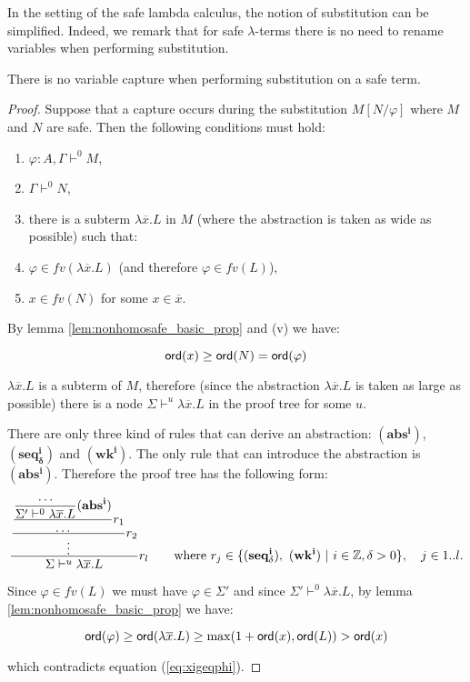 In the setting of the safe lambda calculus, the notion of substitution can be simplified.
Indeed, we remark that for safe $\lambda$-terms there is no need to rename variables
when performing substitution.

\begin{lem}
\label{lem:noclash}
There is no variable capture when performing substitution on a safe term.
\end{lem}
\begin{proof}
Suppose that a capture occurs during the substitution $M[N/\varphi]$
where $M$ and $N$ are safe. Then the following conditions must hold:
\begin{enumerate}
\item $\varphi:A, \Gamma \vdash^0 M$,
\item $\Gamma \vdash^0 N$,
\item there is a subterm $\lambda \overline{x} . L$ in $M$ (where the abstraction is taken as wide as possible) such that:
\item $\varphi \in fv(\lambda \overline{x} . L)$ (and therefore $\varphi \in fv(L)$),
\item $x \in fv(N)$ for some $x \in \overline{x}$.
\end{enumerate}

By lemma \ref{lem:nonhomosafe_basic_prop} and (v) we have:

\begin{equation}
{\sf ord}(x) \geq {\sf ord}(N) = {\sf ord}(\varphi) \label{eq:xigeqphi}
\end{equation}

$\lambda \overline{x} . L$ is a subterm of $M$, therefore (since the
abstraction $\lambda \overline{x}.L$ is taken as large as possible)
there is a node $\Sigma \vdash^u \lambda \overline{x} . L$ in the
proof tree for some $u$.

There are only three kind of rules that can derive an abstraction:
$\mathbf{(abs^i)}$, $\mathbf{(seq^i_\delta)}$ and $\mathbf{(wk^i)}$.
The only rule that can introduce the abstraction is
$\mathbf{(abs^i)}$. Therefore the proof tree has the following form:

$$ \rulef{
    \rulef{
        \rulef{
            \rulef  {\ldots}
                   {\Sigma' \vdash^0 \lambda \overline{x} . L} \mathbf{(abs^i)}
        }
        {\ldots} r_1
    }
    {\vdots} r_2
    }
    { \Sigma \vdash^u \lambda \overline{x} . L } r_l
    \qquad \mbox{where } r_j \in \{ \mathbf{(seq^i_\delta)},\ \mathbf{(wk^i)}\ |\ i \in \zset, \delta > 0 \},
            \quad j\in 1..l.
$$


Since $\varphi \in fv (L)$ we must have $\varphi \in \Sigma'$ and
since $\Sigma' \vdash^0 \lambda \overline{x} . L$, by lemma
\ref{lem:nonhomosafe_basic_prop} we have:

$${\sf ord}(\varphi) \geq {\sf ord}(\lambda \overline{x} . L) \geq \max(1+ {\sf ord}(x), {\sf ord}(L)) > {\sf ord}(x)$$

which contradicts equation (\ref{eq:xigeqphi}).
\end{proof}

